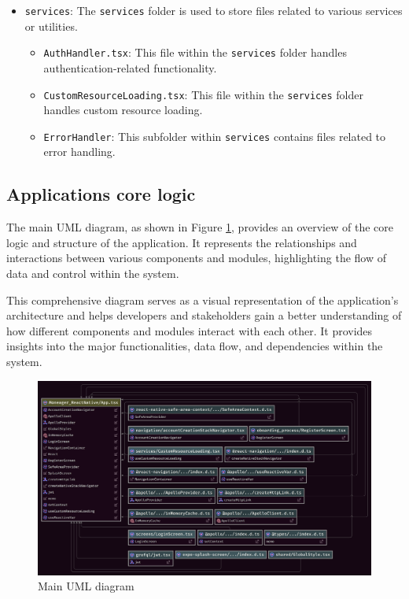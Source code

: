\begin{itemize}
  \item \texttt{services}: The \texttt{services} folder is used to store files related to various services or utilities.
    \begin{itemize}
      \item \texttt{AuthHandler.tsx}: This file within the \texttt{services} folder handles authentication-related functionality.
      \item \texttt{CustomResourceLoading.tsx}: This file within the \texttt{services} folder handles custom resource loading.
      \item \texttt{ErrorHandler}: This subfolder within \texttt{services} contains files related to error handling.
    \end{itemize}
\end{itemize}


\subsection{Applications core logic} 


The main UML diagram, as shown in Figure \ref{fig:transaction_flow}, provides an overview of the core logic and structure of the application. It represents the relationships and interactions between various components and modules, highlighting the flow of data and control within the system.

This comprehensive diagram serves as a visual representation of the application's architecture and helps developers and stakeholders gain a better understanding of how different components and modules interact with each other. It provides insights into the major functionalities, data flow, and dependencies within the system.

\begin{figure}[h!]
  \centering
  \includegraphics[width=\textwidth]{Diagram/MainDiagram.png}
  \caption{Main UML diagram}
  \label{fig:transaction_flow}
\end{figure}



